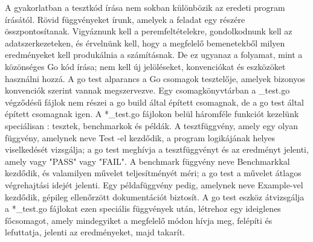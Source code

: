 A gyakorlatban a tesztkód írása nem sokban különbözik az eredeti program írásától. Rövid függvényeket írunk, amelyek a feladat egy részére összpontosítanak. Vigyáznunk kell a peremfeltételekre, gondolkodnunk kell az adatszerkezeteken, és érvelnünk kell, hogy a megfelelő bemenetekből milyen eredményeket kell produkálnia a számításnak. De ez ugyanaz a folyamat, mint a közönséges Go kód írása; nem kell új jelöléseket, konvenciókat és eszközöket használni hozzá.
A go test alparancs a Go csomagok tesztelője, amelyek bizonyos konvenciók szerint vannak megszervezve. Egy csomagkönyvtárban a \_test.go végződésű fájlok nem részei a go build által épített csomagnak, de a go test által épített csomagnak igen. A *\_test.go fájlokon belül háromféle funkciót kezelünk speciálisan : tesztek, benchmarkok és példák. A tesztfüggvény, amely egy olyan függvény, amelynek neve Test -el kezdődik, a program logikájának helyes viselkedését vizsgálja; a go test meghívja a tesztfüggvényt és az eredményt jelenti, amely vagy "PASS" vagy "FAIL". A benchmark függvény neve Benchmarkkal kezdődik, és valamilyen művelet teljesítményét méri; a go test a művelet átlagos végrehajtási idejét jelenti. Egy példafüggvény pedig, amelynek neve Example-vel kezdődik, gépileg ellenőrzött dokumentációt biztosít. A go test eszköz átvizsgálja a *\_test.go fájlokat ezen speciális függvények után, létrehoz egy ideiglenes főcsomagot, amely mindegyiket a megfelelő módon hívja meg, felépíti és lefuttatja, jelenti az eredményeket, majd takarít.
\cite{Alan15}